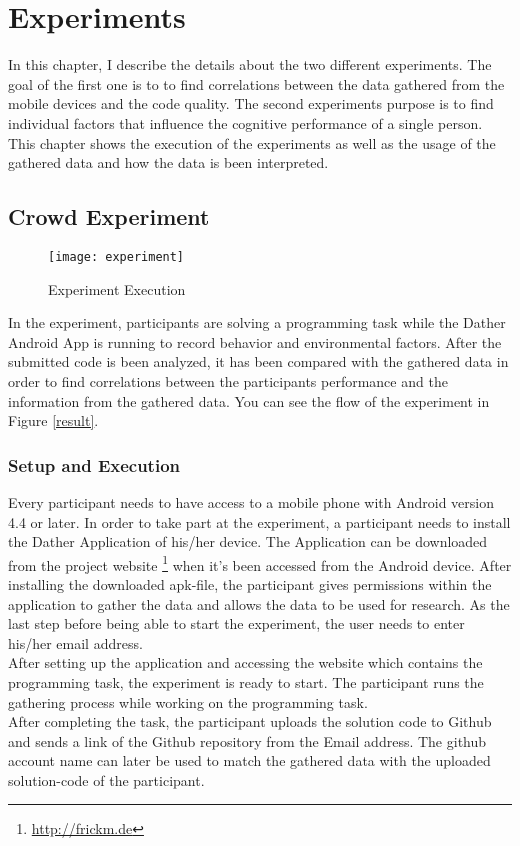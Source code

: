 \chapter{Experiments}
In this chapter, I describe the details about the two different experiments. The goal of the first one is to to find correlations between the data gathered from the mobile devices and the code quality. The second experiments purpose is to find individual factors that influence the cognitive performance of a single person. \\
This chapter shows the execution of the experiments as well as the usage of the gathered data and how the data is been interpreted. 

\section{Crowd Experiment}

\begin{figure}
\texttt{[image: experiment]}
\caption{Experiment Execution}\label{experiment}
\vspace{10 mm}
\end{figure}

In the experiment, participants are solving a programming task while the Dather Android App is running to record behavior and environmental factors. After the submitted code is been analyzed, it has been compared with the gathered data in order to find correlations between the participants performance and the information from the gathered data. You can see the flow of the experiment in Figure \ref{result}. 
\subsection{Setup and Execution}
Every participant needs to have access to a mobile phone with Android version 4.4 or later. In order to take part at the experiment, a participant needs to install the Dather Application of his/her device. The Application can be downloaded from the project website \footnote{\url{http://frickm.de}} when it's been accessed from the Android device. 
\bigbreak
After installing the downloaded apk-file, the participant gives permissions within the application to gather the data and allows the data to be used for research. 
As the last step before being able to start the experiment, the user needs to enter his/her email address.\\
After setting up the application and accessing the website which contains the programming task, the experiment is ready to start. The participant runs the gathering process while working on the programming task.\\
After completing the task, the participant uploads the solution code to Github and sends a link of the Github repository from the Email address. The github account name can later be used to match the gathered data with the uploaded solution-code of the participant. 

